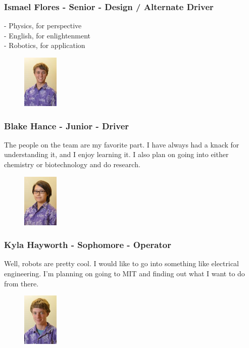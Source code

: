 \subsubsection{Ismael Flores - Senior - Design / Alternate Driver} 
- Physics, for perspective\\
- English, for enlightenment\\
- Robotics, for application

\begin{figure}
	\color{darkgray}
	\centering
	\includegraphics[height=1in]{blake}
\end{figure}
\subsubsection{Blake Hance - Junior - Driver} 
The people on the team are my favorite part.  I have always had a knack for understanding it, and I enjoy learning it. I also plan on going into either chemistry or biotechnology and do research.

\begin{figure}
	\color{darkgray}
	\centering
	\includegraphics[height=1in]{kyla}
\end{figure}
\subsubsection{Kyla Hayworth - Sophomore - Operator} 
Well, robots are pretty cool. I would like to go into something like electrical engineering.  I'm planning on going to MIT and finding out what I want to do from there. \\

\begin{figure}
	\color{darkgray}
	\centering
	\includegraphics[height=1in]{jackson}
\end{figure}
